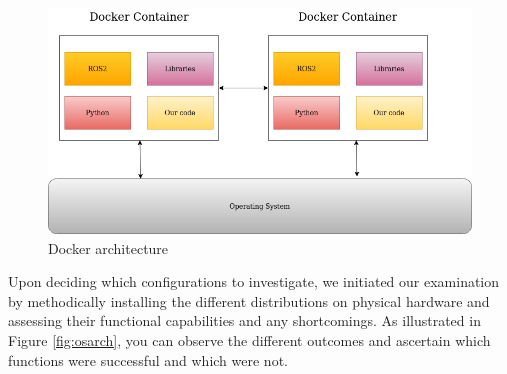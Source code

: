 \begin{figure}[H]
    \centering
    \includegraphics[scale=0.5]{fig/Docker Architecture.drawio.png}
    \caption{Docker architecture}
    \label{fig:dockerarch}
\end{figure}

Upon deciding which configurations to investigate, we initiated our examination by methodically installing the different distributions on physical hardware and assessing their functional capabilities and any shortcomings. As illustrated in Figure \ref{fig:osarch}, you can observe the different outcomes and ascertain which functions were successful and which were not. \\ 

